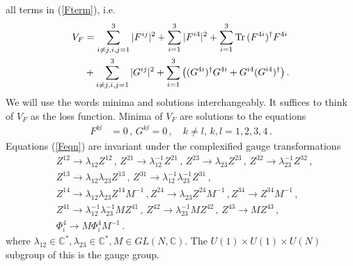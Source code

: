 \documentclass[12pt,a4paper]{JHEP3}
\newcommand{\refb}[1]{(\ref{#1})}
\newcommand{\Tr}{\mathop{\mathrm{Tr}}}
\newcommand{\nn}{\ensuremath{\nonumber{}}}
\begin{document}
all terms in \refb{Fterm}, i.e. 
\begin{align}
\nn
V_F &=  \sum_{i \neq j, i,j =1}^3 |F^{ij}|^2 + \sum_{i=1}^3 |F^{i4}|^2 +  \sum_{i=1}^3 \Tr{} (F^{4i})^\dagger F^{4i} \\
&+ \sum_{i \neq j, i,j =1}^3 |G^{ij}|^2 + \sum_{i=1}^3 \left( (G^{4i})^\dagger G^{4i} + G^{i4} (G^{i4})^\dagger  \right) \label{V_F}.
\end{align}
We will use the words minima and solutions interchangeably.
It suffices to think of $V_F$ as the loss function. Minima of $V_F$ are solutions to the equations
\begin{align}
F^{kl} &= 0 \, , \, G^{kl} = 0 \, , \quad k \neq l, \, k,l =1,2,3,4 \, . \label{Feqn}
\end{align}
Equations \refb{Feqn} are invariant under the complexified gauge transformations
\begin{align}
\nonumber
&Z^{12} \rightarrow \lambda_{12} Z^{12} \, , \, Z^{21} \rightarrow \lambda_{12}^{-1} Z^{21} \, , \, 
Z^{23} \rightarrow \lambda_{23} Z^{23} \, , \, Z^{32} \rightarrow \lambda_{23}^{-1} Z^{32} \, , \\
\nonumber
&Z^{13} \rightarrow \lambda_{12} \lambda_{23} Z^{13} \, , \, Z^{31} \rightarrow \lambda_{12}^{-1} \lambda_{23}^{-1} Z^{31} \, , \\
\nonumber
&Z^{14} \rightarrow \lambda_{12} \lambda_{23} Z^{14} M^{-1} \, ,  Z^{24} \rightarrow \lambda_{23} Z^{24} M^{-1} \, ,  Z^{34} \rightarrow  Z^{34} M^{-1} \, , \\
\nonumber
&Z^{41} \rightarrow \lambda_{12}^{-1} \lambda_{23}^{-1} M Z^{41} \, , \, Z^{42} \rightarrow \lambda_{23}^{-1} M Z^{42} \, , \, Z^{43} \rightarrow M Z^{43} \, , \\
&\Phi_i^{4} \rightarrow M \Phi^{4}_i M^{-1} \, . \label{complexgauge}
\end{align}
where $\lambda_{12} \in \mathbb{C}^\ast, \lambda_{23} \in \mathbb{C}^\ast,  M \in GL(N, \mathbb{C})$. The $U(1) \times  U(1) \times U(N)$ subgroup of this is the gauge group.  
\end{document}
